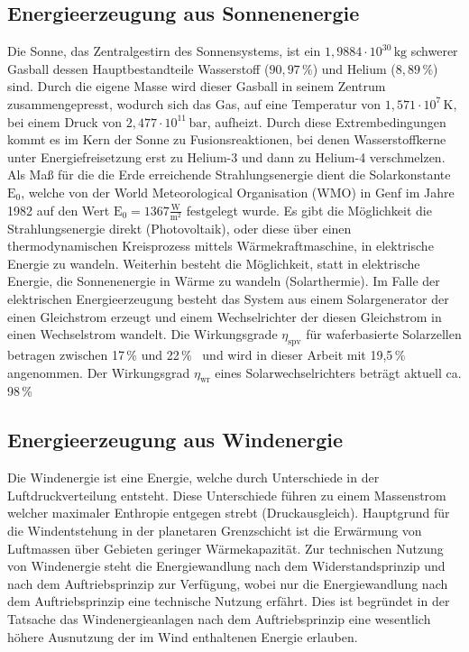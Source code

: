     \subsection{Energieerzeugung aus Sonnenenergie}
    Die Sonne, das Zentralgestirn des Sonnensystems, ist ein \(\mathrm{1,9884\cdot 10^{30}\,kg}\) schwerer Gasball dessen Hauptbestandteile Wasserstoff (\(\mathrm{90,97\,\%}\)) und Helium (\( \mathrm{ 8,89\,\%}\))\cite{Webp:NASAFFSheet} sind.
    Durch die eigene Masse wird dieser Gasball in seinem Zentrum zusammengepresst, wodurch sich das Gas, auf eine Temperatur von \(\mathrm{1,571\cdot 10^{7}\,K}\), bei einem Druck von \(\mathrm{2,477\cdot 10^{11}\,bar}\)\cite{Webp:NASAFFSheet}, aufheizt.
    Durch diese Extrembedingungen kommt es im Kern der Sonne zu Fusionsreaktionen, bei denen Wasserstoffkerne unter Energiefreisetzung erst zu Helium-3 und dann zu Helium-4 verschmelzen.
    Als Maß für die die Erde erreichende Strahlungsenergie dient die Solarkonstante \(\mathrm{E_0}\), welche von der World Meteorological Organisation (WMO) in Genf im Jahre 1982 auf den Wert \(\mathrm{E_0 = 1367 \frac{W}{m^2}}\) festgelegt wurde.\cite[S8]{BK:GPHV}
    Es gibt die Möglichkeit die Strahlungsenergie direkt (Photovoltaik), oder diese über einen thermodynamischen Kreisprozess mittels Wärmekraftmaschine, in elektrische Energie zu wandeln.
    Weiterhin besteht die Möglichkeit, statt in elektrische Energie, die Sonnenenergie in Wärme zu wandeln (Solarthermie).
    Im Falle der elektrischen Energieerzeugung besteht das System aus einem Solargenerator der einen Gleichstrom erzeugt und einem Wechselrichter der diesen Gleichstrom in einen Wechselstrom wandelt.
    Die Wirkungsgrade \(\eta_\mathrm{spv}\) für waferbasierte Solarzellen betragen zwischen 17\,\% und 22\,\%~\cite[S41]{Webp:ISESOLAR} und wird in dieser Arbeit mit 19,5\,\% angenommen.
    Der Wirkungsgrad \(\eta_\mathrm{wr}\) eines Solarwechselrichters beträgt aktuell ca. 98\,\%~\cite[S42]{Webp:ISESOLAR}

    \subsection{Energieerzeugung aus Windenergie}
    Die Windenergie ist eine Energie, welche durch Unterschiede in der Luftdruckverteilung entsteht.
    Diese Unterschiede führen zu einem Massenstrom welcher maximaler Enthropie entgegen strebt (Druckausgleich).
    Hauptgrund für die Windentstehung in der planetaren Grenzschicht ist die Erwärmung von Luftmassen über Gebieten geringer Wärmekapazität.\cite[S 4.24]{TR:REN1}
    Zur technischen Nutzung von Windenergie steht die Energiewandlung nach dem Widerstandsprinzip und nach dem Auftriebsprinzip zur Verfügung, wobei nur die Energiewandlung nach dem Auftriebsprinzip eine technische Nutzung erfährt.
    Dies ist begründet in der Tatsache das Windenergieanlagen nach dem Auftriebsprinzip eine wesentlich höhere Ausnutzung der im Wind enthaltenen Energie erlauben.

